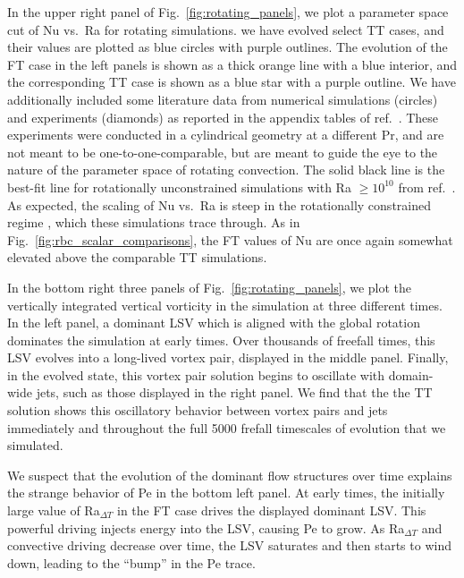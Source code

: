 \documentclass[aps, pre, onecolumn, nofootinbib, notitlepage, groupedaddress, amsfonts, amssymb, amsmath, longbibliography, superscriptaddress]{revtex4-1}
\begin{document}
In the upper right panel of Fig.~\ref{fig:rotating_panels}, we plot a parameter space cut of Nu vs.~Ra for rotating simulations.
we have evolved select TT cases, and their values are plotted as blue circles with purple outlines.
The evolution of the FT case in the left panels is shown as a thick orange line with a blue interior, and the corresponding TT case is shown as a blue star with a purple outline.
We have additionally included some literature data from numerical simulations (circles) and experiments (diamonds) as reported in the appendix tables of ref.~\cite{cheng&all2015}.
These experiments were conducted in a cylindrical geometry at a different Pr, and are not meant to be one-to-one-comparable, but are meant to guide the eye to the nature of the parameter space of rotating convection.
The solid black line is the best-fit line for rotationally unconstrained simulations with Ra $\geq 10^{10}$ from ref.~\cite{cheng&all2015}.
As expected, the scaling of Nu vs.~Ra is steep in the rotationally constrained regime \cite{julien&all2012, plumley&julien2019}, which these simulations trace through.
As in Fig.~\ref{fig:rbc_scalar_comparisons}, the FT values of Nu are once again somewhat elevated above the comparable TT simulations.

In the bottom right three panels of Fig.~\ref{fig:rotating_panels}, we plot the vertically integrated vertical vorticity in the simulation at three different times.
In the left panel, a dominant LSV which is aligned with the global rotation dominates the simulation at early times.
Over thousands of freefall times, this LSV evolves into a long-lived vortex pair, displayed in the middle panel.
Finally, in the evolved state, this vortex pair solution begins to oscillate with domain-wide jets, such as those displayed in the right panel.
We find that the the TT solution shows this oscillatory behavior between vortex pairs and jets immediately and throughout the full 5000 frefall timescales of evolution that we simulated.

We suspect that the evolution of the dominant flow structures over time explains the strange behavior of Pe in the bottom left panel.
At early times, the initially large value of Ra$_{\Delta T}$ in the FT case drives the displayed dominant LSV.
This powerful driving injects energy into the LSV, causing Pe to grow.
As Ra$_{\Delta T}$ and convective driving decrease over time, the LSV saturates and then starts to wind down, leading to the ``bump'' in the Pe trace.
\end{document}
